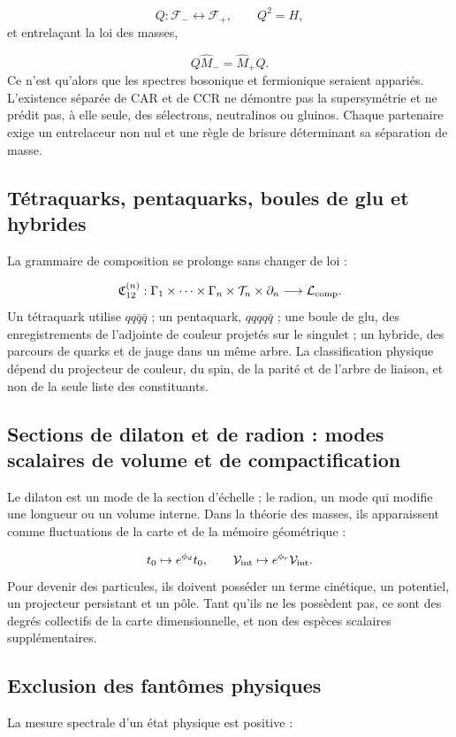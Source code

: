 \[
 Q:\mathcal F_-\leftrightarrow\mathcal F_+,
\qquad
 Q^2=H,
\]
et entrelaçant la loi des masses,

\[
 Q\widehat M_-=\widehat M_+Q.
\]
Ce n'est qu'alors que les spectres bosonique et fermionique seraient appariés. L'existence séparée de CAR et de CCR ne démontre pas la supersymétrie et ne prédit pas, à elle seule, des sélectrons, neutralinos ou gluinos. Chaque partenaire exige un entrelaceur non nul et une règle de brisure déterminant sa séparation de masse.

\subsection{Tétraquarks, pentaquarks, boules de glu et hybrides}
La grammaire de composition se prolonge sans changer de loi :

\[
 \mathfrak C_{12}^{(n)}:
 \Gamma_1\times\cdots\times\Gamma_n
 \times\mathcal T_n\times\partial_n
 \longrightarrow\mathcal L_{\rm comp}.
\]
Un tétraquark utilise \(qq\bar q\bar q\) ; un pentaquark, \(qqqq\bar q\) ; une boule de glu, des enregistrements de l'adjointe de couleur projetés sur le singulet ; un hybride, des parcours de quarks et de jauge dans un même arbre. La classification physique dépend du projecteur de couleur, du spin, de la parité et de l'arbre de liaison, et non de la seule liste des constituants.

\subsection{Sections de dilaton et de radion : modes scalaires de volume et de compactification}
Le dilaton est un mode de la section d'échelle ; le radion, un mode qui modifie une longueur ou un volume interne. Dans la théorie des masses, ils apparaissent comme fluctuations de la carte et de la mémoire géométrique :

\[
 t_0\mapsto e^{\phi_d}t_0,\qquad
 \mathcal V_{\rm int}\mapsto e^{\phi_r}\mathcal V_{\rm int}.
\]
Pour devenir des particules, ils doivent posséder un terme cinétique, un potentiel, un projecteur persistant et un pôle. Tant qu'ils ne les possèdent pas, ce sont des degrés collectifs de la carte dimensionnelle, et non des espèces scalaires supplémentaires.

\subsection{Exclusion des fantômes physiques}
La mesure spectrale d'un état physique est positive :

